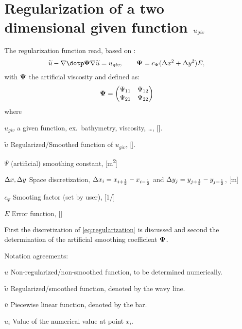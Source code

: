 \chapter{Regularization of a two dimensional given function $u_{\it{giv}}$}
The regularization function read, based on \citet[eq.\ 6]{Borsboom1998}:
\begin{align}
    \widetilde{u} - \nabla \dotp \bPsi \nabla \widetilde{u} = u_{\it{giv}}, \qquad \bPsi = c_{\Psi}(\Delta x^2 + \Dy^2) E,
    \label{eq:regularization}
\end{align}
with $\boldsymbol{\Psi}$ the artificial viscosity and defined as:
\begin{align}
    \boldsymbol{\Psi} =
    \begin{pmatrix}
        \Psi_{11} & \Psi_{12} \\
        \Psi_{21} & \Psi_{22}
    \end{pmatrix}
\end{align}
where
\begin{symbollist}
    \item[$u_{giv}$] a given function, ex.\ bathymetry, viscosity, \ldots, [\si{\cdot}].
    \item[$\widetilde{u}$] Regularized/Smoothed function of $u_{giv}$, [\si{\cdot}].
    \item[$\Psi$] (artificial) smoothing constant, [\si{\square\metre}]
    \item[$\Delta x, \Delta y$] Space discretization, $\Delta x_{i} = x_{i+\frac{1}{2}} - x_{i-\frac{1}{2}}$ and $\Delta y_{j} = y_{j+\frac{1}{2}} - y_{j-\frac{1}{2}}$, [\si{\metre}]
    \item[$c_{\Psi}$] Smooting factor (set by user), [\si{1/\cdot}]
    \item[$E$] Error function, [\si{\cdot}]
\end{symbollist}
First the discretization of \autoref{eq:regularization} is discussed and second the determination of the artificial smoothing coefficient $\boldsymbol{\Psi}$.

Notation agreements:
\begin{symbollist}
    \item[$u$] Non-regularized/non-smoothed function, to be determined numerically.
    \item[$\widetilde u$] Regularized/smoothed function, denoted by the wavy line.
    \item[$\overline u$] Piecewise linear function, denoted by the bar.
    \item[$u_i$] Value of the numerical value at point $x_i$.
\end{symbollist}
